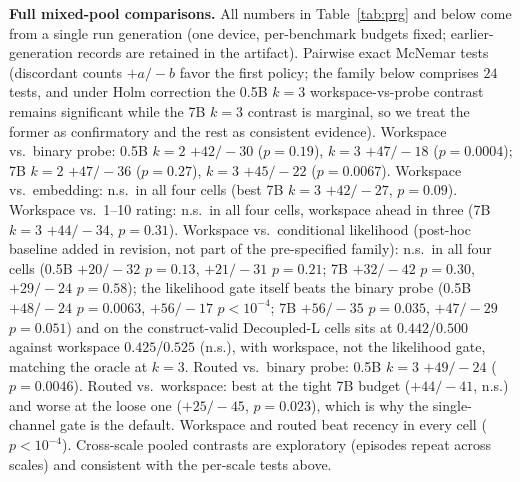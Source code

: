 \textbf{Full mixed-pool comparisons.} All numbers in Table~\ref{tab:prg}
and below come from a single run generation (one device, per-benchmark
budgets fixed; earlier-generation records are retained in the artifact).
Pairwise exact McNemar tests (discordant counts $+a/-b$ favor the first
policy; the family below comprises $24$ tests, and under Holm correction the
0.5B $k{=}3$ workspace-vs-probe contrast remains significant while the 7B
$k{=}3$ contrast is marginal, so we treat the former as confirmatory and the
rest as consistent evidence). Workspace vs.\ binary probe: 0.5B $k{=}2$
$+42/-30$ ($p{=}0.19$), $k{=}3$ $+47/-18$ ($p{=}0.0004$); 7B $k{=}2$
$+47/-36$ ($p{=}0.27$), $k{=}3$ $+45/-22$ ($p{=}0.0067$). Workspace vs.\ embedding: n.s.\ in all four cells
(best 7B $k{=}3$ $+42/-27$, $p{=}0.09$). Workspace vs.\ 1--10 rating:
n.s.\ in all four cells, workspace ahead in three (7B $k{=}3$ $+44/-34$,
$p{=}0.31$). Workspace vs.\
conditional likelihood (post-hoc baseline added in revision, not part of the
pre-specified family): n.s.\ in all four cells (0.5B $+20/-32$ $p{=}0.13$,
$+21/-31$ $p{=}0.21$; 7B $+32/-42$ $p{=}0.30$, $+29/-24$ $p{=}0.58$); the
likelihood gate itself beats the binary probe (0.5B $+48/-24$ $p{=}0.0063$,
$+56/-17$ $p{<}10^{-4}$; 7B $+56/-35$ $p{=}0.035$, $+47/-29$ $p{=}0.051$)
and on the construct-valid Decoupled-L cells sits at $0.442$/$0.500$ against
workspace $0.425$/$0.525$ (n.s.), with workspace, not the likelihood gate,
matching the oracle at $k{=}3$. Routed vs.\ binary probe: 0.5B $k{=}3$ $+49/-24$
($p{=}0.0046$). Routed vs.\ workspace: best at the tight 7B budget
($+44/-41$, n.s.) and worse at the loose one ($+25/-45$, $p{=}0.023$),
which is why the single-channel gate is the default. Workspace and routed
beat recency in every cell ($p{<}10^{-4}$). Cross-scale pooled contrasts are
exploratory (episodes repeat across scales) and consistent with the per-scale
tests above.

